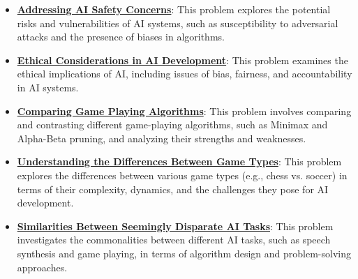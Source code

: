 \documentclass{article}%
\begin{document}
\begin{itemize}[leftmargin=*]
\item \href{https://purdue.brightspace.com/d2l/common/assets/pdfjs-d2l-dist/1.0.14-legacy/web/viewer.html?file=\%2Fcontent\%2Fenforced\%2F1095467-wl.202510.CS.24300.001\%2F02L2-Intro.pdf\%3Fou\%3D1095467\&lang=en-us\&container=d2l-fileviewer-rendered-pdf\&fullscreen=d2l-fileviewer-rendered-pdf-dialog\&height=667#page=19}{\textbf{Addressing AI Safety Concerns}}: This problem explores the potential risks and vulnerabilities of AI systems, such as susceptibility to adversarial attacks and the presence of biases in algorithms.%
\item \href{https://purdue.brightspace.com/d2l/common/assets/pdfjs-d2l-dist/1.0.14-legacy/web/viewer.html?file=\%2Fcontent\%2Fenforced\%2F1095467-wl.202510.CS.24300.001\%2F02L2-Intro.pdf\%3Fou\%3D1095467\&lang=en-us\&container=d2l-fileviewer-rendered-pdf\&fullscreen=d2l-fileviewer-rendered-pdf-dialog\&height=667#page=20}{\textbf{Ethical Considerations in AI Development}}: This problem examines the ethical implications of AI, including issues of bias, fairness, and accountability in AI systems.%
\item \href{https://purdue.brightspace.com/d2l/common/assets/pdfjs-d2l-dist/1.0.14-legacy/web/viewer.html?file=\%2Fcontent\%2Fenforced\%2F1095467-wl.202510.CS.24300.001\%2F02L2-Intro.pdf\%3Fou\%3D1095467\&lang=en-us\&container=d2l-fileviewer-rendered-pdf\&fullscreen=d2l-fileviewer-rendered-pdf-dialog\&height=667#page=22}{\textbf{Comparing Game Playing Algorithms}}: This problem involves comparing and contrasting different game{-}playing algorithms, such as Minimax and Alpha{-}Beta pruning, and analyzing their strengths and weaknesses.%
\item \href{https://purdue.brightspace.com/d2l/common/assets/pdfjs-d2l-dist/1.0.14-legacy/web/viewer.html?file=\%2Fcontent\%2Fenforced\%2F1095467-wl.202510.CS.24300.001\%2F02L2-Intro.pdf\%3Fou\%3D1095467\&lang=en-us\&container=d2l-fileviewer-rendered-pdf\&fullscreen=d2l-fileviewer-rendered-pdf-dialog\&height=667#page=27}{\textbf{Understanding the Differences Between Game Types}}: This problem explores the differences between various game types (e.g., chess vs. soccer) in terms of their complexity, dynamics, and the challenges they pose for AI development.%
\item \href{https://purdue.brightspace.com/d2l/common/assets/pdfjs-d2l-dist/1.0.14-legacy/web/viewer.html?file=\%2Fcontent\%2Fenforced\%2F1095467-wl.202510.CS.24300.001\%2F02L2-Intro.pdf\%3Fou\%3D1095467\&lang=en-us\&container=d2l-fileviewer-rendered-pdf\&fullscreen=d2l-fileviewer-rendered-pdf-dialog\&height=667#page=31}{\textbf{Similarities Between Seemingly Disparate AI Tasks}}: This problem investigates the commonalities between different AI tasks, such as speech synthesis and game playing, in terms of algorithm design and problem{-}solving approaches.%

\end{itemize}
\end{document}
